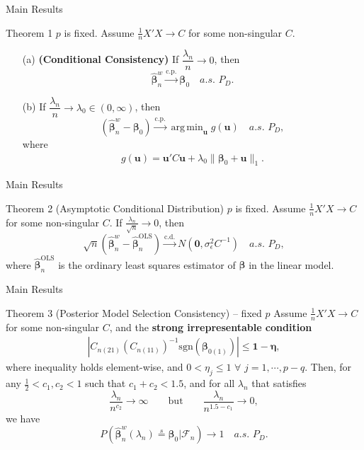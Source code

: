 \documentclass{beamer}
\DeclareMathOperator*{\argmin}{arg\,min}
\newcommand{\bnw}{\widehat{\bm{\beta}}_n^w} %
\newcommand{\bLS}{\widehat{\bm{\beta}}_n^{\text{OLS}}} %
\newcommand{\be}{\bm{\beta}} %
\newcommand{\CONV}[1]{\stackrel{\text{#1}}{\longrightarrow}} %
\begin{document}
\begin{frame}{Main Results}
	\begin{block}{Theorem 1}
		$p$ is fixed. Assume $\frac{1}{n} X' X \to C$ for some non-singular $C$. 
		\begin{itemize}
			\item [ (a) ] \textbf{(Conditional Consistency)} If $\dfrac{\lambda_n}{n} \to 0$, then
			$$
			\bnw \CONV{c.p.} \bm{\beta}_0 \quad a.s. \,\, P_D.
			$$
			\item [ (b) ] 	If $\dfrac{\lambda_n}{n} \to \lambda_0 \in (0,\infty)$, then 
			$$
			\left( \bnw - \bm{\beta}_0 \right) \CONV{c.p.} \argmin_{\bm{u}} g(\bm{u}) \quad a.s. \,\, P_D,
			$$
			where
			\begin{align*} 
			g(\bm{u}) = \bm{u}' C \bm{u} 
			+ \lambda_0 \| \bm{\beta}_0 + \bm{u} \|_1 .
			\end{align*}  
		\end{itemize} 
	\end{block}
\end{frame}

\begin{frame}{Main Results}
	\begin{block}{Theorem 2 (Asymptotic Conditional Distribution)}
		$p$ is fixed. Assume $\frac{1}{n} X' X \to C$ for some non-singular $C$. If $\frac{\lambda_n}{\sqrt{n}} \to 0$, then
		$$
		\sqrt{n} \left( 
		\bnw - \bLS 
		\right) 
		\CONV{c.d.} 
		N \left( \bm{0}, \sigma^2_{\epsilon} C^{-1} \right)
		\quad a.s. \,\, P_D,
		$$
		where $\bLS$ is the ordinary least squares estimator of $\be$ in the linear model. 	 
	\end{block}
\end{frame}

\begin{frame}{Main Results}
	\begin{block}{Theorem 3 (Posterior Model Selection Consistency) -- fixed $p$}
		Assume $\frac{1}{n} X' X \to C$ for some non-singular $C$, and the \textbf{strong irrepresentable condition} \citep{BinYu}  
		\begin{align*} 
		\left|
		C_{n(21)} 
		\left( C_{n(11)} \right)^{-1} 
		\text{sgn} \left( \bm{\beta}_{0(1)} \right)
		\right| \leq
		\bm{1} - \bm{\eta},
		\end{align*}
		where inequality holds element-wise, and $0 < \eta_j \leq 1$ $\forall$ $j = 1, \cdots, p-q$. Then, for any $\frac{1}{2} < c_1,c_2 < 1$ such that $c_1 + c_2 < 1.5$, and for all $\lambda_n$ that satisfies 
		$$
		\dfrac{\lambda_n}{n^{c_2}} \to \infty
		\qquad \text{but} \qquad
		\dfrac{\lambda_n}{n^{1.5 - c_1}} \to 0,
		$$
		we have
		$$
		P\left(
		\bnw (\lambda_n) \stackrel{s}{=} \bm{\beta}_0
		\big| \mathcal{F}_n 
		\right)	
		\to 1
		\quad a.s. \,\, P_D.
		$$ 
	\end{block}
\end{frame}
\end{document}
